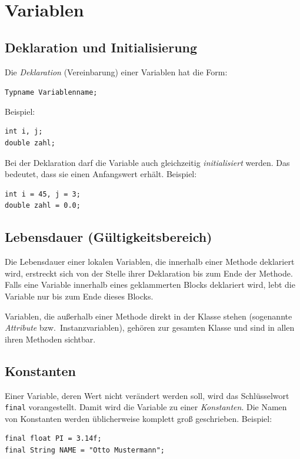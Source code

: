 \section{Variablen}

\subsection{Deklaration und Initialisierung}

Die \emph{Deklaration} (Vereinbarung) einer Variablen hat die Form:

\lstinline|Typname Variablenname;|

Beispiel:

\begin{lstlisting}
int i, j;
double zahl;
\end{lstlisting}

Bei der Deklaration darf die Variable auch gleichzeitig \emph{initialisiert}
werden. Das bedeutet, dass sie einen Anfangswert erhält. Beispiel:

\begin{lstlisting}
int i = 45, j = 3;
double zahl = 0.0;
\end{lstlisting}


\subsection{Lebensdauer (Gültigkeitsbereich)}

Die Lebensdauer einer lokalen Variablen, die innerhalb einer Methode deklariert
wird, erstreckt sich von der Stelle ihrer Deklaration bis zum Ende der Methode.
Falls eine Variable innerhalb eines geklammerten Blocks deklariert wird, lebt
die Variable nur bis zum Ende dieses Blocks.

Variablen, die außerhalb einer Methode direkt in der Klasse stehen (sogenannte
\emph{Attribute} bzw.\ Instanzvariablen), gehören zur gesamten Klasse und sind
in allen ihren Methoden sichtbar.


\subsection{Konstanten}

Einer Variable, deren Wert nicht verändert werden soll, wird das Schlüsselwort
\lstinline|final| vorangestellt. Damit wird die Variable zu einer
\emph{Konstanten}. Die Namen von Konstanten werden üblicherweise komplett groß
geschrieben. Beispiel:

\begin{lstlisting}
final float PI = 3.14f;
final String NAME = "Otto Mustermann";
\end{lstlisting}


